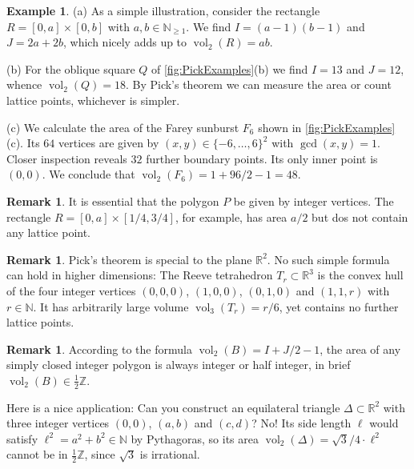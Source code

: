 \documentclass[a4paper]{amsart}
\numberwithin{equation}{section}
\theoremstyle{plain}
\theoremstyle{definition}
\newtheorem{remark}[theorem]{Remark}
\newtheorem{example}[theorem]{Example}
\newcommand{\N}{\mathbb{N}}
\newcommand{\Z}{\mathbb{Z}}
\newcommand{\R}{\mathbb{R}}
\DeclareMathOperator{\vol}{vol}
\begin{document}
\begin{example}
  (a) As a simple illustration, consider %
  the rectangle $R = [0,a] \times [0,b]$ with $a,b \in \N_{\ge1}$.
  We find $I = (a-1) (b-1)$ and $J = 2 a + 2 b$,
  which nicely adds up to $\vol_2(R) = a b$.

  (b) For the oblique square $Q$ of \autoref{fig:PickExamples}(b) 
  we find $I = 13$ and $J = 12$, whence $\vol_2(Q) = 18$.
  By Pick's theorem we can measure the area
  or count lattice points, whichever is simpler.
  
  (c) We calculate the area of the Farey sunburst $F_6$ shown in \autoref{fig:PickExamples}(c).
  Its $64$ vertices are given by $(x,y) \in \{-6,\dots,6\}^2$ with $\gcd(x,y) = 1$.
  Closer inspection reveals $32$ further boundary points. Its only inner point is $(0,0)$.
  We conclude that $\vol_2(F_6) = 1 + 96/2 - 1 = 48$.
\end{example}


\begin{remark}
  It is essential that the polygon $P$ be given by integer vertices.
  The rectangle $R = [0,a] \times [1/4,3/4]$, for example,
  has area $a/2$ but dos not contain any lattice point.
\end{remark}

\begin{remark}
  Pick's theorem is special to the plane $\R^2$.
  No such simple formula can hold in higher dimensions:
  The Reeve tetrahedron $T_r \subset \R^3$ is the convex
  hull of the four integer vertices $(0,0,0)$, $(1,0,0)$, $(0,1,0)$
  and $(1,1,r)$ with $r \in \N$.
  It has arbitrarily large volume $\vol_3(T_r) = r/6$,
  yet contains no further lattice points.
\end{remark}

\begin{remark}
  According to the formula $\vol_2(B) = I + J/2 - 1$,
  the area of any simply closed integer polygon
  is always integer or half integer,
  in brief $\vol_2(B) \in \frac{1}{2} \Z$.

  Here is a nice application: %
  Can you construct an equilateral triangle $\Delta \subset \R^2$
  with three integer vertices $(0,0)$, $(a,b)$ and $(c,d)$?
  No!  Its side length $\ell$ would satisfy $\ell^2 = a^2 + b^2 \in \N$ by Pythagoras,
  so its area $\vol_2(\Delta) = \sqrt{3}/4 \cdot \ell^2$
  cannot be in $\frac{1}{2} \Z$, since $\sqrt{3}$ is irrational.
\end{remark}
\end{document}
